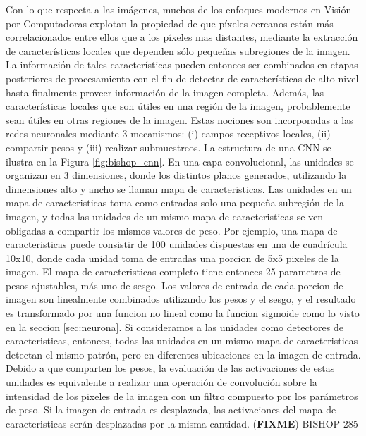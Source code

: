 \documentclass[a4paper,11pt,spanish]{book}
\newcommand*{\FIXME}[1]{{(\textbf{FIXME}) {#1}}}
\begin{document}
    Con lo que respecta a las imágenes, muchos de los enfoques modernos en Visión por Computadoras explotan la propiedad de que píxeles cercanos están más correlacionados entre ellos que a los píxeles mas
    distantes, mediante la extracción de características locales que dependen sólo pequeñas subregiones de la imagen. La información de tales características pueden entonces ser combinados
    en etapas posteriores de procesamiento con el fin de detectar de características de alto nivel hasta finalmente proveer información de la imagen completa. Además, las características
    locales que son útiles en una región de la imagen, probablemente sean útiles en otras regiones de la imagen. 
    Estas nociones son incorporadas a las redes neuronales mediante 3 mecanismos: (i) campos receptivos locales, (ii) compartir pesos y (iii) realizar submuestreos. 
    La estructura de una CNN se ilustra en la Figura \ref{fig:bishop_cnn}. En una capa convolucional, las unidades se organizan en 3 dimensiones, donde los distintos planos generados,
    utilizando la dimensiones alto y ancho se llaman mapa de caracteristicas.
    Las unidades en un mapa de caracteristicas toma como entradas solo una pequeña subregión de la imagen, y todas las unidades de un mismo mapa de caracteristicas se 
    ven obligadas a compartir los mismos valores de peso. Por ejemplo, una mapa de caracteristicas puede consistir de 100 unidades dispuestas en una de cuadrícula 10x10, 
    donde cada unidad  toma de entradas una porcion de 5x5 pixeles de la imagen. El mapa de caracteristicas completo tiene entonces 25 parametros de pesos ajustables,
    más uno de sesgo. Los valores de entrada de cada porcion de imagen son linealmente combinados utilizando los pesos y el sesgo, y el resultado  es transformado por una funcion no lineal
    como la funcion sigmoide como lo visto en la seccion \ref{sec:neurona}. 
    Si consideramos a las unidades como detectores de caracteristicas, entonces, todas las unidades en un mismo mapa de caracteristicas detectan el mismo patrón, pero en diferentes 
    ubicaciones en la imagen de entrada. Debido a que comparten los pesos, la evaluación de las activaciones de estas unidades es equivalente a  realizar una operación de convolución 
    sobre la intensidad de los pixeles de la imagen con un filtro compuesto por los parámetros de peso. Si la imagen de entrada es desplazada, las activaciones del mapa de caracteristicas serán desplazadas por la misma cantidad.
    \FIXME{BISHOP 285}
\end{document}
